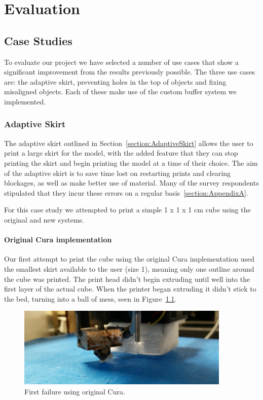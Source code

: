 \documentclass[pdftex, 11pt]{report} %
\begin{document}
\chapter{Evaluation}
\section{Case Studies}
To evaluate our project we have selected a number of use cases that show a significant improvement from the results previously possible. The three use cases are: the adaptive skirt, preventing holes in the top of objects and fixing misaligned objects. Each of these make use of the custom buffer system we implemented.

\subsection{Adaptive Skirt}
The adaptive skirt outlined in Section~\ref{section:AdaptiveSkirt} allows the user to print a large skirt for the model, with the added feature that they can stop printing the skirt and begin printing the model at a time of their choice. The aim of the adaptive skirt is to save time lost on restarting prints and clearing blockages, as well as make better use of material. Many of the survey respondents stipulated that they incur these errors on a regular basis~\ref{section:AppendixA}.

For this case study we attempted to print a simple 1 x 1 x 1 cm cube using the original and new systems.  

\subsubsection{Original Cura implementation}
Our first attempt to print the cube using the original Cura implementation used the smallest skirt available to the user (size 1), meaning only one outline around the cube was printed. The print head didn't begin extruding until well into the first layer of the actual cube. When the printer began extruding it didn't stick to the bed, turning into a ball of mess, seen in Figure~\ref{figure:SkirtOld1}.

\begin{figure}[H]
  \centering
  \includegraphics[width=4in]{SkirtOld1.png}
  \caption{First failure using original Cura.}
  \label{figure:SkirtOld1}
\end{figure}
\end{document}
